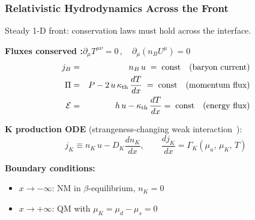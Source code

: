 \documentclass{beamer}
\newcommand{\bea}{\begin{eqnarray}}
\newcommand{\eea}{\end{eqnarray}}
\newcommand{\bi}{\begin{itemize}}
\newcommand{\ei}{\end{itemize}}
\begin{document}
\begin{frame}
\frametitle{Relativistic Hydrodynamics Across the Front}

Steady 1-D front: conservation laws must hold across the interface.

\vspace{0.5em}
\textbf{Fluxes conserved :}\qquad  $\partial_\mu T^{\mu\nu} = 0\,,\quad  \partial_\mu (n_B U^\mu) = 0$
\bea
j_B &=& n_B\,u \;=\; \text{const} \quad \text{(baryon current)} \nonumber\\
\Pi  &=& P - 2\,u\,\kappa_{\rm th}\,\frac{dT}{dx} \;=\; \text{const} \quad \text{(momentum flux)} \nonumber\\
\mathcal{E} &=& h\,u - \kappa_{\rm th}\,\frac{dT}{dx} =\; \text{const} \quad \text{(energy flux)} \nonumber
\eea

\vspace{0.3em}
\textbf{K production ODE} (strangeness-changing weak interaction~\cite{Madsen:1993xx}):
\[
j_K \equiv n_K\,u - D_K\frac{dn_K}{dx}, \qquad \frac{dj_K}{dx} = \Gamma_K(\mu_u,\,\mu_K,\,T)
\]

\textbf{Boundary conditions:}
\bi
  \item $x\to-\infty$: NM in $\beta$-equilibrium, $n_K = 0$
  \item $x\to+\infty$: QM with $\mu_K = \mu_d - \mu_s = 0$
\ei


\end{frame}
\end{document}
